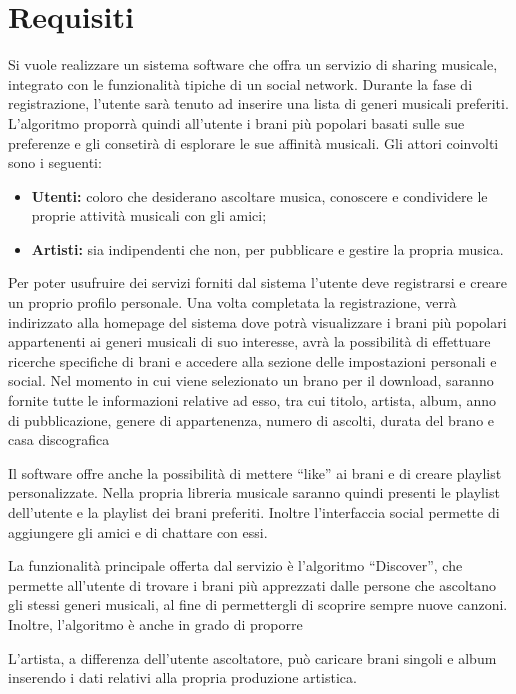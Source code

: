 \section{Requisiti}

Si vuole realizzare un sistema software che offra un servizio di sharing musicale, integrato
con le funzionalità tipiche di un social network. Durante la fase di registrazione, l'utente
sarà tenuto ad 
inserire una lista di generi musicali preferiti. L'algoritmo proporrà quindi all'utente i
brani più popolari basati sulle sue preferenze e gli consetirà di esplorare le sue
affinità musicali. Gli attori coinvolti sono i seguenti:
\begin{itemize}
      \item \textbf{Utenti:} coloro che desiderano ascoltare musica, conoscere e condividere le proprie
            attività musicali con gli amici;
      \item \textbf{Artisti:} sia indipendenti che non, per pubblicare e gestire la propria musica.
\end{itemize}

Per poter usufruire dei servizi forniti dal sistema l'utente deve registrarsi e creare un proprio
profilo personale. Una volta completata la registrazione, verrà indirizzato alla homepage del sistema 
dove potrà visualizzare i brani più popolari appartenenti ai generi musicali di suo interesse, avrà la 
possibilità di effettuare ricerche specifiche di brani e accedere alla sezione delle impostazioni personali e social. 
Nel momento in cui viene selezionato un brano per il download, saranno fornite tutte le informazioni relative ad esso, 
tra cui titolo, artista, album, anno di pubblicazione, genere di appartenenza, numero di ascolti, durata del brano e casa discografica

Il software offre anche la possibilità di mettere ``like'' ai brani e di creare playlist
personalizzate. Nella propria libreria musicale saranno quindi presenti le playlist dell'utente e
la playlist dei brani preferiti. Inoltre l'interfaccia social permette di aggiungere gli
amici e di chattare con essi.

La funzionalità principale offerta dal servizio è l'algoritmo ``Discover'', che permette all'utente
di trovare i brani più apprezzati dalle persone che ascoltano gli stessi generi musicali, 
al fine di permettergli di scoprire sempre nuove canzoni. Inoltre, l'algoritmo è anche in grado di proporre

L'artista, a differenza dell'utente ascoltatore, può caricare brani singoli e album
inserendo i dati relativi alla propria produzione artistica.

